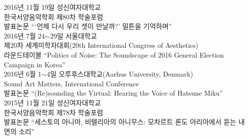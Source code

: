 \documentclass[a4paper,10pt,draft]{article}
\begin{document}
  \noindent 2016년 11월 19일 성신여자대학교\\
  한국서양음악학회 제80차 학술포럼\\
  발표논문 “‘언제 다시 우리 셋이 만날까?’ 밀튼을 기억하며”\\
  
  \noindent 2016년 7월 24$\sim$29일 서울대학교\\
  제20차 세계미학자대회(20th International Congress of Aesthetics)\\
  라운드테이블 “Politics of Noise: The Soundscape of 2016 General Election Campaign in Korea”\\
  
  \noindent 2016년 6월 1$\sim$4일 오루후스대학교(Aarhus University, Denmark)\\
  Sound Art Matters, International Conference\\
  발표논문 “(Re)sounding the Virtual: Hearing the Voice of Hatsune Miku”\\
  
  \noindent 2015년 11월 21일 성신여자대학교\\
  한국서양음악학회 제78차 학술포럼\\
  발표논문 “세스토의 아니마, 비텔리아의 아니무스: 모차르트 론도 아리아에서 듣는 내면의 소리”\\
  
  
  
  
  
\end{document}
